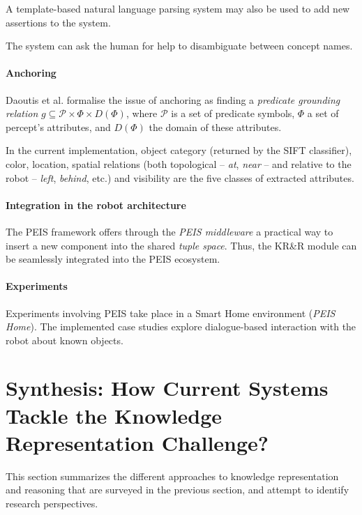 \documentclass[journal]{IEEEtran}
\begin{document}
A template-based natural language parsing system may also be used to add new
assertions to the system.

The system can ask the human for help to disambiguate between concept names.

\paragraph{Anchoring} Daoutis et al. formalise the issue of anchoring as
finding a \emph{predicate grounding relation} $g \subseteq \mathcal{P} \times
\Phi \times D(\Phi)$, where $\mathcal{P}$ is a set of predicate symbols, $\Phi$
a set of percept's attributes, and $D(\Phi)$ the domain of these attributes.

In the current implementation, object category (returned by the SIFT
classifier), color, location, spatial relations (both topological -- \emph{at},
\emph{near} -- and relative to the robot -- \emph{left}, \emph{behind}, etc.)
and visibility are the five classes of extracted attributes.

\paragraph{Integration in the robot architecture}
\label{sect|peis-integration}

The PEIS framework offers through the \emph{PEIS middleware} a practical way to
insert a new component into the shared \emph{tuple space}.  Thus, the KR\&R
module can be seamlessly integrated into the PEIS ecosystem.

\paragraph{Experiments} Experiments involving PEIS take place in a Smart Home
environment (\emph{PEIS Home}). The implemented case studies explore
dialogue-based interaction with the robot about known objects.


\section{Synthesis: How Current Systems Tackle the Knowledge Representation
Challenge?}
\label{sect|conclusion}

This section summarizes the different approaches to knowledge representation and
reasoning that are surveyed in the previous section, and attempt to identify
research perspectives.
\end{document}
